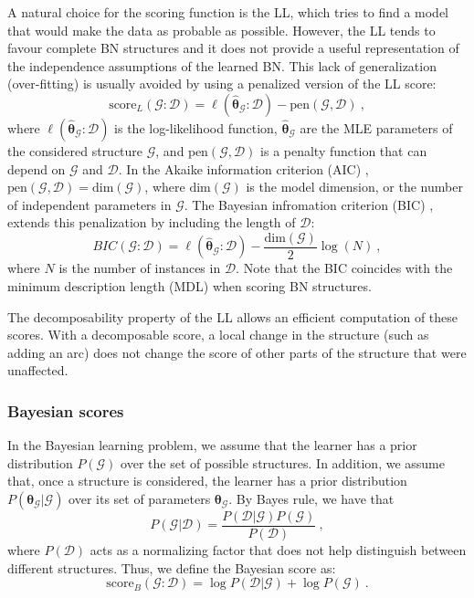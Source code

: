 A natural choice for the scoring function is the LL, which tries to find a model that would make the data as probable as possible. However, the LL tends to favour complete BN structures and it does not provide a useful representation of the independence assumptions of the learned BN. This lack of generalization (over-fitting) is usually avoided by using a penalized version of the LL score:
\begin{equation} \label{eq:penalized_log_likelihood}
\text{score}_{L}(\mathcal{G}: \mathcal{D}) = \ell(\hat{\bm{\theta}}_{\mathcal{G}} : \mathcal{D}) - \text{pen}(\mathcal{G}, \mathcal{D}) \ ,
\end{equation}
where $\ell(\hat{\bm{\theta}}_{\mathcal{G}} : \mathcal{D})$ is the log-likelihood function, $\hat{\bm{\theta}}_{\mathcal{G}}$ are the MLE parameters of the considered structure $\mathcal{G}$, and $\text{pen}(\mathcal{G}, \mathcal{D})$ is a penalty function that can depend on $\mathcal{G}$ and $\mathcal{D}$. In the Akaike information criterion (AIC) \citep{akaike1974}, $\text{pen}(\mathcal{G}, \mathcal{D}) = \text{dim}(\mathcal{G})$, where $\text{dim}(\mathcal{G})$ is the model dimension, or the number of independent parameters in $\mathcal{G}$. The Bayesian infromation criterion (BIC) \citep{schwarz1978}, extends this penalization by including the length of $\mathcal{D}$:
\begin{equation*}
BIC(\mathcal{G}: \mathcal{D}) = \ell(\hat{\bm{\theta}}_{\mathcal{G}} : \mathcal{D}) - \frac{\text{dim}(\mathcal{G})}{2} \log(N) \ ,
\end{equation*}
where $N$ is the number of instances in $\mathcal{D}$. Note that the BIC coincides with the minimum description length (MDL) \citep{lam1994} when scoring BN structures. 

The decomposability property of the LL allows an efficient computation of these scores. With a decomposable score, a local change in the structure (such as adding an arc) does not change the score of other parts of the structure that were unaffected.

\subsubsection*{Bayesian scores}

In the Bayesian learning problem, we assume that the learner has a prior distribution $P(\mathcal{G})$ over the set of possible structures. In addition, we assume that, once a structure is considered, the learner has a prior distribution $P(\bm{\theta}_{\mathcal{G}} | \mathcal{G})$ over its set of parameters $\bm{\theta}_{\mathcal{G}}$. By Bayes rule, we have that
\begin{equation*}
P(\mathcal{G} | \mathcal{D}) = \frac{P(\mathcal{D | \mathcal{G}}) P(\mathcal{G})}{P(\mathcal{D})} \ ,
\end{equation*}
where $P(\mathcal{D})$ acts as a normalizing factor that does not help distinguish between different structures. Thus, we define the Bayesian score as:
\begin{equation*}
\text{score}_{B}(\mathcal{G} : \mathcal{D}) = \log P(\mathcal{D} | \mathcal{G}) + \log P(\mathcal{G}) \ .
\end{equation*}

